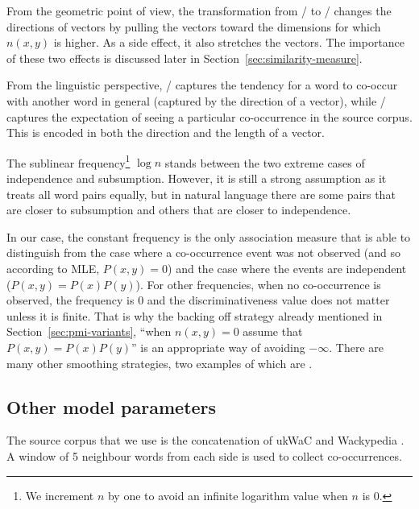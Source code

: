 From the geometric point of view, the transformation from \PMI/ to \NPMI/ changes the directions of vectors by pulling the vectors toward the dimensions for which $n(x, y)$ is higher. As a side effect, it also stretches the vectors. The importance of these two effects is discussed later in Section~\ref{sec:similarity-measure}.

From the linguistic perspective, \PMI/ captures the tendency for a word to co-occur with another word in general (captured by the direction of a vector), while \NPMI/ captures the expectation of seeing a particular co-occurrence in the source corpus. This is encoded in both the direction and the length of a vector.

The sublinear frequency\footnote{We increment $n$ by one to avoid an infinite logarithm value when $n$ is 0.} $\log n$ stands between the two extreme cases of independence and subsumption. However, it is still a strong assumption as it treats all word pairs equally, but in natural language there are some pairs that are closer to subsumption and others that are closer to independence.

In our case, the constant frequency is the only association measure that is able to distinguish from the case where a co-occurrence event was not observed (and so according to MLE, $P(x, y)= 0$) and the case where the events are independent ($P(x, y) = P(x)P(y)$). For other frequencies, when no co-occurrence is observed, the frequency is 0 and the discriminativeness value does not matter unless it is finite. That is why the backing off strategy already mentioned in Section~\ref{sec:pmi-variants}, ``when $n(x, y) = 0$ assume that $P(x, y) = P(x)P(y)$'' is an appropriate way of avoiding $-\infty$. There are many other smoothing strategies, two examples of which are .

\subsection{Other model parameters}
\label{sec:other-model-paramt}



The source corpus that we use is the concatenation of ukWaC and Wackypedia \cite{ukwac}.\footnotemark{} A window of 5 neighbour words from each side is used to collect co-occurrences.
%
%

